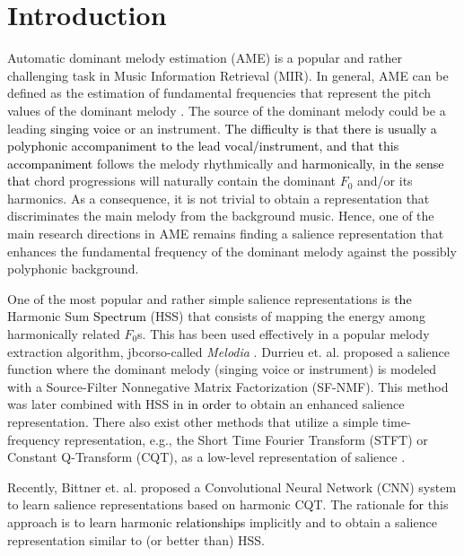 \documentclass{article}
\newcommand{\gp}[1]{{\textcolor{black}{#1}}}
\newcommand{\secor}[2]{{\textcolor{black}{#2}}}
\newcommand{\secmt}[1]{}
\newcommand{\jb}[1]{{\textcolor{black}{#1}}}
\newcommand{\jbcor}[2]{{\textcolor{black}{#2}}}
\begin{document}
\section{Introduction}\label{sec:introduction}

Automatic dominant melody estimation (AME) is a popular and rather challenging task in Music Information Retrieval (MIR). 
In general, AME can be defined as the estimation of fundamental frequencies that represent the pitch values of the dominant melody \cite{Metrics}. 
The source of the dominant melody could be a leading \secor{vocal}{singing voice} or an instrument. 
\jb{The difficulty is that there is usually a polyphonic accompaniment to the lead vocal/instrument, and that this accompaniment}
follows the melody rhythmically and \secor{in tonal harmony}{harmonically}, \secor{i.e.,}{in the sense that} chord progressions will naturally contain the dominant $F_0$ and/or its harmonics. 
As a consequence, it is not trivial to obtain a representation that discriminates the main melody from the background music. 
Hence, one of the main research directions in AME remains finding a salience representation that enhances the fundamental frequency of the dominant melody against the possibly polyphonic background.

One of the most popular and rather simple salience representations is \gp{the} Harmonic Sum \gp{Spectrum} (HSS) \cite{harmonicsummation} that consists of mapping the energy among harmonically related $F_0$s\secmt{to ??}. 
This has been used effectively in a popular melody extraction algorithm, jbcor{so-called}{} \emph{Melodia} \cite{melodia}. Durrieu et. al.\cite{Durrieu,Durrieu-2} proposed a salience function where the dominant melody (singing voice or instrument) is modeled with a Source-Filter Nonnegative Matrix Factorization (SF-NMF). This method was later combined with HSS in \cite{bittner2016_comparison} \jb{in order} to obtain an enhanced salience representation. There also exist other methods that utilize a simple time-frequency representation, e.g., the Short Time Fourier Transform (STFT) or Constant Q-Transform (CQT), as a low-level representation of salience \cite{CQTbasedMelodyTracking,STFTbasedMelody}. 

Recently, Bittner et. al. \cite{bittner2017_deep} proposed a Convolutional Neural Network (CNN)
system
to learn salience representations based on harmonic CQT. 
The rationale \jb{for} this approach is to learn harmonic \jbcor{relations}{relationships} implicitly and to obtain a salience representation similar to (or better than) HSS.
\end{document}
